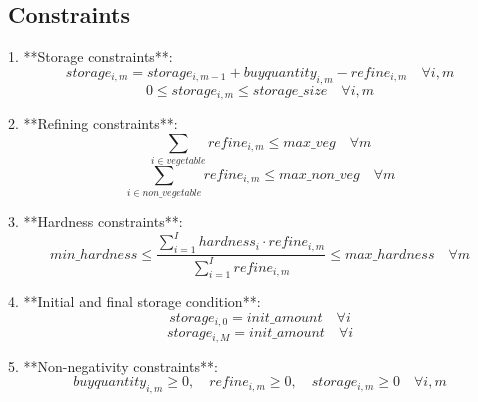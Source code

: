\documentclass{article}
\begin{document}
\subsection*{Constraints}
1. **Storage constraints**:
\[
storage_{i,m} = storage_{i,m-1} + buyquantity_{i,m} - refine_{i,m} \quad \forall i, m
\]
\[
0 \leq storage_{i,m} \leq storage\_size \quad \forall i, m
\]

2. **Refining constraints**:
\[
\sum_{i \in vegetable} refine_{i,m} \leq max\_veg \quad \forall m
\]
\[
\sum_{i \in non\_vegetable} refine_{i,m} \leq max\_non\_veg \quad \forall m
\]

3. **Hardness constraints**:
\[
min\_hardness \leq \frac{\sum_{i=1}^{I} hardness_{i} \cdot refine_{i,m}}{\sum_{i=1}^{I} refine_{i,m}} \leq max\_hardness \quad \forall m
\]

4. **Initial and final storage condition**:
\[
storage_{i,0} = init\_amount \quad \forall i
\]
\[
storage_{i,M} = init\_amount \quad \forall i
\]

5. **Non-negativity constraints**:
\[
buyquantity_{i,m} \geq 0, \quad refine_{i,m} \geq 0, \quad storage_{i,m} \geq 0 \quad \forall i, m
\]
\end{document}
